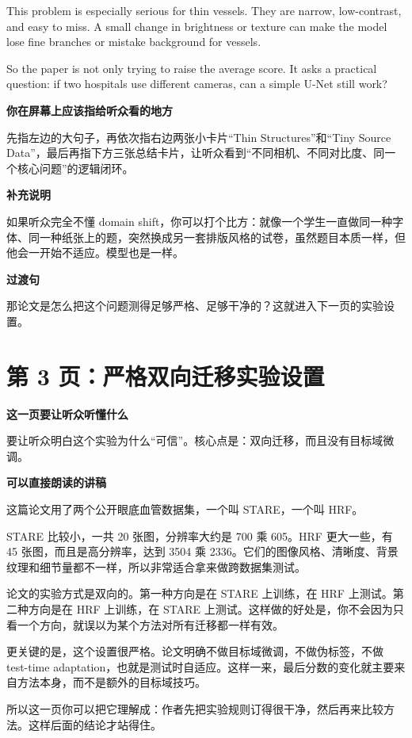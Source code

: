 \documentclass[12pt,a4paper]{ctexart}
\begin{document}
This problem is especially serious for thin vessels. They are narrow, low-contrast, and easy to miss. A small change in brightness or texture can make the model lose fine branches or mistake background for vessels.

So the paper is not only trying to raise the average score. It asks a practical question: if two hospitals use different cameras, can a simple U-Net still work?

\textbf{你在屏幕上应该指给听众看的地方}

先指左边的大句子，再依次指右边两张小卡片“Thin Structures”和“Tiny Source Data”，最后再指下方三张总结卡片，让听众看到“不同相机、不同对比度、同一个核心问题”的逻辑闭环。

\textbf{补充说明}

如果听众完全不懂 domain shift，你可以打个比方：就像一个学生一直做同一种字体、同一种纸张上的题，突然换成另一套排版风格的试卷，虽然题目本质一样，但他会一开始不适应。模型也是一样。

\textbf{过渡句}

那论文是怎么把这个问题测得足够严格、足够干净的？这就进入下一页的实验设置。

\section*{第 3 页：严格双向迁移实验设置}

\textbf{这一页要让听众听懂什么}

要让听众明白这个实验为什么“可信”。核心点是：双向迁移，而且没有目标域微调。

\textbf{可以直接朗读的讲稿}

这篇论文用了两个公开眼底血管数据集，一个叫 STARE，一个叫 HRF。

STARE 比较小，一共 20 张图，分辨率大约是 700 乘 605。HRF 更大一些，有 45 张图，而且是高分辨率，达到 3504 乘 2336。它们的图像风格、清晰度、背景纹理和细节量都不一样，所以非常适合拿来做跨数据集测试。

论文的实验方式是双向的。第一种方向是在 STARE 上训练，在 HRF 上测试。第二种方向是在 HRF 上训练，在 STARE 上测试。这样做的好处是，你不会因为只看一个方向，就误以为某个方法对所有迁移都一样有效。

更关键的是，这个设置很严格。论文明确不做目标域微调，不做伪标签，不做 test-time adaptation，也就是测试时自适应。这样一来，最后分数的变化就主要来自方法本身，而不是额外的目标域技巧。

所以这一页你可以把它理解成：作者先把实验规则订得很干净，然后再来比较方法。这样后面的结论才站得住。
\end{document}
